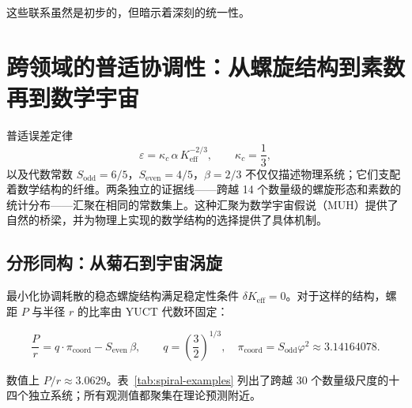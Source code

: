 \documentclass[12pt]{article}
\newcommand{\Keff}{K_{\mathrm{eff}}}
\newcommand{\eps}{\varepsilon}
\newcommand{\kappac}{\kappa_c}
\begin{document}
	这些联系虽然是初步的，但暗示着深刻的统一性。
	
	\section{跨领域的普适协调性：从螺旋结构到素数再到数学宇宙}
	\label{sec:universal}
	
	普适误差定律
	\begin{equation}
		\eps = \kappac\,\alpha\,\Keff^{-2/3}, \qquad \kappac = \frac{1}{3},
		\label{eq:errorlaw}
	\end{equation}
	以及代数常数 \(S_{\mathrm{odd}}=6/5\)，\(S_{\mathrm{even}}=4/5\)，\(\beta=2/3\) 不仅仅描述物理系统；它们支配着数学结构的纤维。两条独立的证据线——跨越 14 个数量级的螺旋形态和素数的统计分布——汇聚在相同的常数集上。这种汇聚为数学宇宙假说（MUH）提供了自然的桥梁，并为物理上实现的数学结构的选择提供了具体机制。
	
	\subsection{分形同构：从菊石到宇宙涡旋}
	
	最小化协调耗散的稳态螺旋结构满足稳定性条件 \(\delta K_{\mathrm{eff}} = 0\)。对于这样的结构，螺距 \(P\) 与半径 \(r\) 的比率由 YUCT 代数环固定：
	
	\begin{equation}
		\boxed{ \frac{P}{r} = q \cdot \pi_{\mathrm{coord}} - S_{\mathrm{even}} \, \beta }, \qquad
		q = \left(\frac{3}{2}\right)^{1/3},\quad
		\pi_{\mathrm{coord}} = S_{\mathrm{odd}} \varphi^2 \approx 3.14164078.
		\label{eq:spiral-universal}
	\end{equation}
	
	数值上 \(P/r \approx 3.0629\)。表~\ref{tab:spiral-examples} 列出了跨越 30 个数量级尺度的十四个独立系统；所有观测值都聚集在理论预测附近。
	
\end{document}
